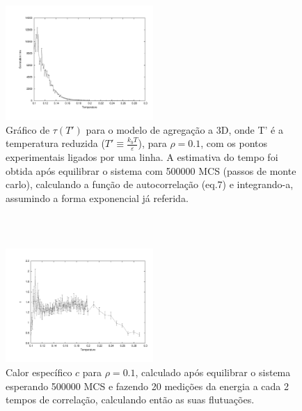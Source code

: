 \documentclass[11pt]{beamer}
\begin{document}
\begin{frame}
\frametitle{\insertsection \\ {\small \insertsubsection}}
\begin{figure}
	\centering
		\includegraphics[width=0.5\textwidth, clip, trim = 1.7cm 1.5cm 1cm 1cm]{images/ctimes1}
	\caption{{\footnotesize Gráfico de $\tau(T')$ para o modelo de agregação a 3D, onde T' é a temperatura reduzida ($T'\equiv\frac{k_b T}{\varepsilon}$), para $\rho = 0.1$, com os pontos experimentais ligados por uma linha. A estimativa do tempo foi obtida após equilibrar o sistema com 500000 MCS (passos de monte carlo), calculando a função de autocorrelação (eq.7) e integrando-a, assumindo a forma exponencial já referida.}}
	\label{fig:7}
\end{figure}
\end{frame}

\begin{frame}
\frametitle{\insertsection \\ {\small \insertsubsection}}
\begin{figure}
	\centering
		\includegraphics[width=0.5\textwidth, clip, trim = 1.7cm 1.5cm 1cm 1cm]{images/0.1/c}
	\caption{{\footnotesize Calor específico $c$ para $\rho = 0.1$, calculado após equilibrar o sistema esperando 500000 MCS e fazendo 20 medições da energia a cada 2 tempos de correlação, calculando então as suas flutuações.}}
	\label{fig:8}
\end{figure}
\end{frame}
\end{document}
